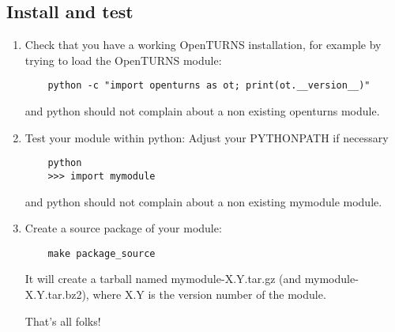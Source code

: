 \subsection{Install and test}
\begin{enumerate}
  \setcounter{enumi}{\value{oldenumi}}
\item Check that you have a working OpenTURNS installation, for example by trying to load the OpenTURNS module:
  \begin{lstlisting}
    python -c "import openturns as ot; print(ot.__version__)"
  \end{lstlisting}
  and python should not complain about a non existing openturns module.

\item Test your module within python:
  Adjust your PYTHONPATH if necessary
  \begin{lstlisting}
    python
    >>> import mymodule
  \end{lstlisting}
  and python should not complain about a non existing mymodule module.

\item Create a source package of your module:
  \begin{lstlisting}
    make package_source
  \end{lstlisting}
  It will create a tarball named mymodule-X.Y.tar.gz (and mymodule-X.Y.tar.bz2), where X.Y is the version number of the module.

  That's all folks!
  \setcounter{oldenumi}{\value{enumi}}
\end{enumerate}

